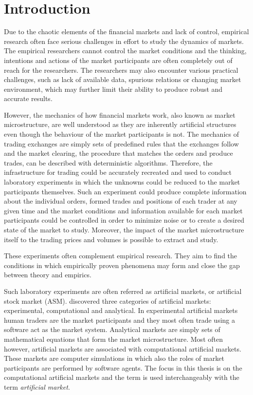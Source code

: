 \section{Introduction}

Due to the chaotic elements of the financial markets and lack of control, 
empirical research often face serious challenges in effort to study the 
dynamics of markets. The empirical researchers cannot control the market conditions 
and the thinking, intentions and actions of the market participants are often completely out of reach
for the researchers. The researchers may also encounter various practical challenges, such as 
lack of available data, spurious relations or changing market environment, 
which may further limit their ability to produce robust and accurate results. 

However, the mechanics of how financial markets work, also known as market
microstructure, are well understood as they are inherently artificial structures 
even though the behaviour of the market participants is not. 
The mechanics of trading exchanges are simply sets of predefined rules 
that the exchanges follow and the market clearing, the procedure 
that matches the orders and produce trades, can be described with 
deterministic algorithms. Therefore, the infrastructure for trading
could be accurately recreated and used to conduct laboratory 
experiments in which the unknowns could be reduced to the market participants
themselves. Such an experiment could produce complete information about
the individual orders, formed trades and positions of each trader at any given time
and the market conditions and information available for each market participants could
be controlled in order to minimize noise or to create a desired state of the market to
study. Moreover, the impact of the market microstructure itself to the trading prices and volumes 
is possible to extract and study. 

These experiments often complement empirical research. They aim to find the
conditions in which empirically proven phenomena may form and close the gap
between theory and empirics. 

Such laboratory experiments are often referred as artificial markets, or artificial
stock market (ASM). \citet{boer05} discovered three categories of artificial markets: 
experimental, computational and analytical. In experimental artificial markets human traders
are the market participants and they most often trade using a software act as
the market system. Analytical markets are simply sets of mathematical equations that
form the market microstructure. Most often however, artificial markets are associated with 
computational artificial markets. These markets are computer simulations in which 
also the roles of market participants are performed by software agents. The focus in this
thesis is on the computational artificial markets and the term is used interchangeably
with the term \textit{artificial market}. 

